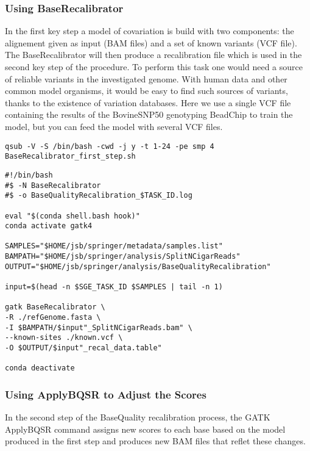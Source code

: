 \subsubsection{Using BaseRecalibrator}

In the first key step  a model of covariation is build with two components: the alignement given as input (BAM files) and a set of known variants (VCF file). The BaseRecalibrator will then produce a recalibration file which is used in the second key step of the procedure. To perform this task one would need a source of reliable variants in the investigated genome. With human data and other common model organisms, it would be easy to find such sources of variants, thanks to the existence of variation databases. Here we use a single VCF file containing the results of the BovineSNP50 genotyping BeadChip to train the model, but you can feed the model with several VCF files.



\begin{verbatim}
qsub -V -S /bin/bash -cwd -j y -t 1-24 -pe smp 4  BaseRecalibrator_first_step.sh
\end{verbatim}



\begin{verbatim}
#!/bin/bash
#$ -N BaseRecalibrator
#$ -o BaseQualityRecalibration_$TASK_ID.log

eval "$(conda shell.bash hook)"
conda activate gatk4

SAMPLES="$HOME/jsb/springer/metadata/samples.list"
BAMPATH="$HOME/jsb/springer/analysis/SplitNCigarReads"
OUTPUT="$HOME/jsb/springer/analysis/BaseQualityRecalibration"

input=$(head -n $SGE_TASK_ID $SAMPLES | tail -n 1)

gatk BaseRecalibrator \
-R ./refGenome.fasta \
-I $BAMPATH/$input"_SplitNCigarReads.bam" \
--known-sites ./known.vcf \
-O $OUTPUT/$input"_recal_data.table"

conda deactivate
\end{verbatim}





\subsubsection{Using ApplyBQSR to Adjust the Scores}

In the second step of the BaseQuality recalibration process, the GATK ApplyBQSR command assigns new scores to each base based on the model produced in the first step and produces new BAM files that reflet these changes.  

